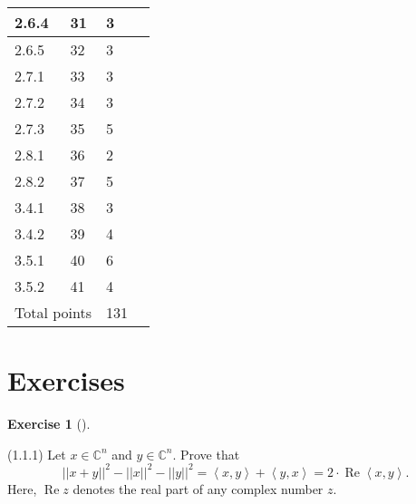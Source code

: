 \documentclass[numbers=enddot,12pt,final,onecolumn,notitlepage]{scrartcl}
\newcounter{exer}
\theoremstyle{definition}
\newtheorem{exmp}[exer]{Exercise}
\newenvironment{exercise}[1][]
{\begin{exmp}[#1]\begin{leftbar}}
        {\end{leftbar}\end{exmp}}
\begin{document}
\begin{table}[!htb]
{\begin{tabular}{|ll|l|l|}
			\multicolumn{1}{|l|}{2.6.4}               & 31                     & 3              &               \\ \hline
			\multicolumn{1}{|l|}{2.6.5}               & 32                     & 3              &               \\ \hline
			\multicolumn{1}{|l|}{2.7.1}               & 33                     & 3              &               \\ \hline
			\multicolumn{1}{|l|}{2.7.2}               & 34                     & 3              &               \\ \hline
			\multicolumn{1}{|l|}{2.7.3}               & 35                     & 5              &               \\ \hline
			\multicolumn{1}{|l|}{2.8.1}               & 36                     & 2              &               \\ \hline
			\multicolumn{1}{|l|}{2.8.2}               & 37                     & 5              &               \\ \hline
			\multicolumn{1}{|l|}{3.4.1}               & 38                     & 3              &               \\ \hline
			\multicolumn{1}{|l|}{3.4.2}               & 39                     & 4              &               \\ \hline
			\multicolumn{1}{|l|}{3.5.1}               & 40                     & 6              &               \\ \hline
			\multicolumn{1}{|l|}{3.5.2}               & 41                     & 4              &               \\ \hline
			\multicolumn{2}{|l|}{Total points}        & 131                    &                                \\ \hline
		\end{tabular}%
	}
\end{table}

\clearpage

\section*{Exercises}

\begin{exercise}
	\label{exe.unitary.innerprod.x+y} (1.1.1) Let $x\in\mathbb{C}^{n}$ and
	$y\in\mathbb{C}^{n}$. Prove that
	\[
		\left\vert \left\vert x+y\right\vert \right\vert ^{2}-\left\vert \left\vert
		x\right\vert \right\vert ^{2}-\left\vert \left\vert y\right\vert \right\vert
		^{2}=\left\langle x,y\right\rangle +\left\langle y,x\right\rangle
		=2\cdot\operatorname*{Re}\left\langle x,y\right\rangle .
	\]
	Here, $\operatorname*{Re}z$ denotes the real part of any complex number $z$.

\end{exercise}
\end{document}
